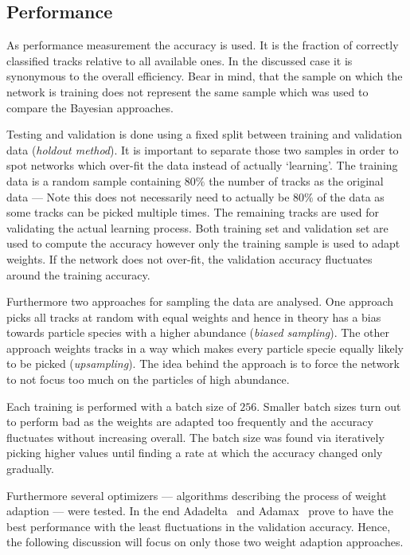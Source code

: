 \subsection{Performance}
\label{subsec:neural_network_performance}

As performance measurement the accuracy is used. It is the fraction of correctly classified tracks relative to all available ones. In the discussed case it is synonymous to the overall efficiency. Bear in mind, that the sample on which the network is training does not represent the same sample which was used to compare the Bayesian approaches.

Testing and validation is done using a fixed split between training and validation data (\textit{holdout method}). It is important to separate those two samples in order to spot networks which over-fit the data instead of actually `learning'. The training data is a random sample containing $80\%$ the number of tracks as the original data --- Note this does not necessarily need to actually be $80\%$ of the data as some tracks can be picked multiple times. The remaining tracks are used for validating the actual learning process. Both training set and validation set are used to compute the accuracy however only the training sample is used to adapt weights. If the network does not over-fit, the validation accuracy fluctuates around the training accuracy.

Furthermore two approaches for sampling the data are analysed. One approach picks all tracks at random with equal weights and hence in theory has a bias towards particle species with a higher abundance (\textit{biased sampling}). The other approach weights tracks in a way which makes every particle specie equally likely to be picked (\textit{upsampling}). The idea behind the approach is to force the network to not focus too much on the particles of high abundance.

Each training is performed with a batch size of $256$. Smaller batch sizes turn out to perform bad as the weights are adapted too frequently and the accuracy fluctuates without increasing overall. The batch size was found via iteratively picking higher values until finding a rate at which the accuracy changed only gradually.

Furthermore several optimizers --- algorithms describing the process of weight adaption --- were tested. In the end Adadelta~\cite{DBLP:journals/corr/abs-1212-5701} and Adamax~\cite{DBLP:journals/corr/KingmaB14} prove to have the best performance with the least fluctuations in the validation accuracy. Hence, the following discussion will focus on only those two weight adaption approaches.

